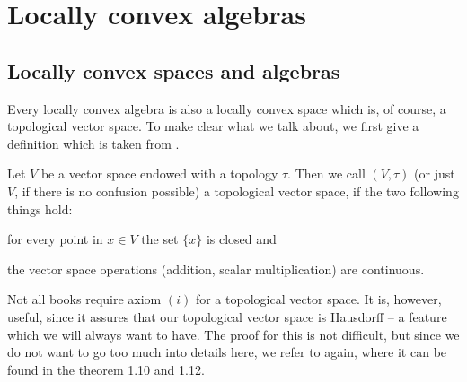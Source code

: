 \section{Locally convex algebras}
\label{sec:chap5_LCAlg}

\subsection{Locally convex spaces and algebras}

Every locally convex algebra is also a locally convex space which 
is, of course, a topological vector space. To make clear what we talk about, 
we first give a definition which is taken from 
\cite[Definition 1.6]{rudin:1991a}.
\begin{definition}
	\label{Def:TVSpace}
	Let $V$ be a vector space endowed with a topology $\tau$. Then we call 
	$(V, \tau)$ (or just $V$, if there is no confusion possible) 
	a topological vector space, if the two following things  hold:
	\begin{definitionlist}
		\item
		for every point in $x \in V$ the set $\{x\} $ is closed and
		
		\item
		the vector space operations (addition, scalar multiplication) are 
		continuous.
	\end{definitionlist}
\end{definition}
Not all books require axiom $(i)$ for a topological vector space. It is, 
however, useful, since it assures that our topological vector 
space is Hausdorff -- a feature which we will always want to have. The proof 
for this is not difficult, but since we do not want to go too much into details 
here, we refer to \cite{rudin:1991a} again, where it can be found in the 
theorem 1.10 and 1.12.


